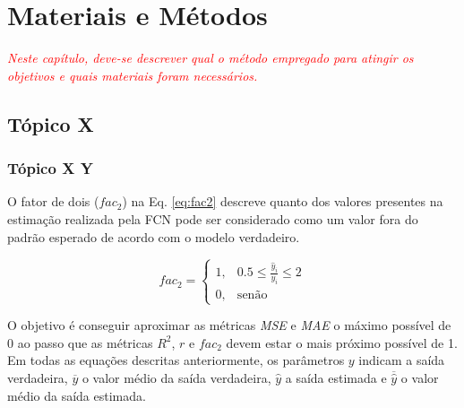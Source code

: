 \chapter{Materiais e Métodos}
\label{chapther:metodologia}

\textit{\textcolor{red}{Neste capítulo, deve-se descrever qual o método empregado para atingir os objetivos e quais materiais foram necessários.}}

\section{Tópico X}
\label{section:metodologia_xxx}

\lipsum[1-1]

\subsection{Tópico X Y}
\label{subsection:metodologia_xxx_yyy}

\lipsum[1-1]

O fator de dois ($fac_2$) na Eq. \ref{eq:fac2} descreve quanto dos valores presentes na estimação realizada pela FCN pode ser considerado como um valor fora do padrão esperado de acordo com o modelo verdadeiro. 

\begin{equation}
    fac_2 =
    \begin{cases}
        1,& 0.5 \leq \frac{\hat{y}_i}{y_i} \leq 2\\
        0,& \text{sen\~ao}
    \end{cases}
    \label{eq:fac2}
\end{equation}

O objetivo é conseguir aproximar as métricas \textit{MSE} e \textit{MAE} o máximo possível de 0 ao passo que as métricas $R^2$, $r$ e $fac_2$ devem estar o mais próximo possível de 1. Em todas as equações descritas anteriormente, os parâmetros $y$ indicam a saída verdadeira, $\overline{y}$ o valor médio da saída verdadeira, $\hat{y}$ a saída estimada e $\overline{\hat{y}}$ o valor médio da saída estimada.